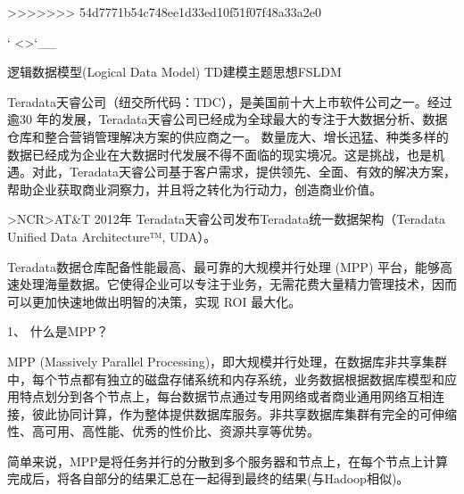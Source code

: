 \documentclass[letterpaper,12pt,english]{sphinxmanual}
\begin{document}


>>>>>>> 54d7771b54c748ee1d33ed10f51f07f48a33a2e0


` <>`\_\_


逻辑数据模型(Logical Data Model)
TD建模主题思想FS\sphinxhyphen{}LDM

Teradata天睿公司（纽交所代码：TDC），是美国前十大上市软件公司之一。经过逾30 年的发展，Teradata天睿公司已经成为全球最大的专注于大数据分析、数据仓库和整合营销管理解决方案的供应商之一。
数量庞大、增长迅猛、种类多样的数据已经成为企业在大数据时代发展不得不面临的现实境况。这是挑战，也是机遇。对此，Teradata天睿公司基于客户需求，提供领先、全面、有效的解决方案，帮助企业获取商业洞察力，并且将之转化为行动力，创造商业价值。

\sphinxhyphen{}>NCR\sphinxhyphen{}>AT\&T
2012年 Teradata天睿公司发布Teradata统一数据架构（Teradata Unified Data Architecture™, UDA）。

Teradata数据仓库配备性能最高、最可靠的大规模并行处理 (MPP) 平台，能够高速处理海量数据。它使得企业可以专注于业务，无需花费大量精力管理技术，因而可以更加快速地做出明智的决策，实现 ROI 最大化。

1、 什么是MPP？

MPP (Massively Parallel Processing)，即大规模并行处理，在数据库非共享集群中，每个节点都有独立的磁盘存储系统和内存系统，业务数据根据数据库模型和应用特点划分到各个节点上，每台数据节点通过专用网络或者商业通用网络互相连接，彼此协同计算，作为整体提供数据库服务。非共享数据库集群有完全的可伸缩性、高可用、高性能、优秀的性价比、资源共享等优势。

简单来说，MPP是将任务并行的分散到多个服务器和节点上，在每个节点上计算完成后，将各自部分的结果汇总在一起得到最终的结果(与Hadoop相似)。

\end{document}
